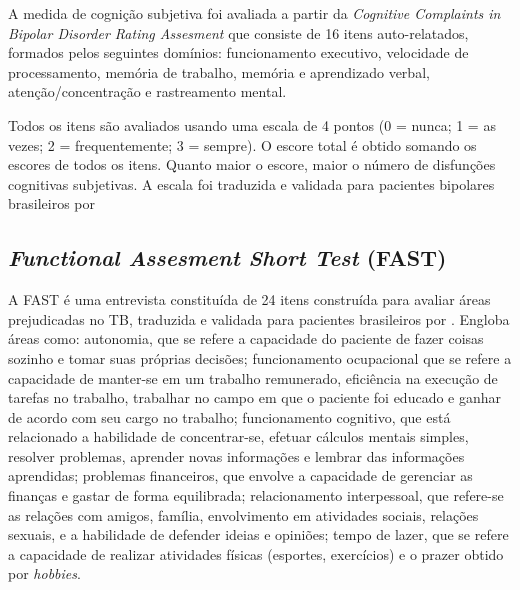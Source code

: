 \documentclass[chapter=TITLE,
               oneside,
               12pt,
               a4paper,
               english,
               brazil]{abntex2}    %
\begin{document}
            A medida de cognição subjetiva foi avaliada a partir da
            \textit{Cognitive Complaints in Bipolar Disorder Rating Assesment}
            que consiste de 16 itens auto-relatados, formados pelos seguintes domínios:
            funcionamento executivo, velocidade de processamento, memória de trabalho,
            memória e aprendizado verbal, atenção/concentração e rastreamento mental.
    
            Todos os itens são avaliados usando uma escala de 4 pontos
            (0 = nunca; 1 = as vezes; 2 = frequentemente; 3 = sempre).
            O escore total é obtido somando os escores de todos os itens.
            Quanto maior o escore, maior o número de disfunções cognitivas subjetivas.
            A escala foi traduzida e validada para pacientes bipolares brasileiros
            por \textcite{lima_validity_2018}
    
        \subsection{\textit{Functional Assesment Short Test} (FAST)}
        \label{sec:fast}
    
            A FAST é uma entrevista constituída de 24 itens construída para avaliar
            áreas prejudicadas no TB, traduzida e validada para pacientes brasileiros
            por \textcite{cacilhas_validity_2009}.
            Engloba áreas como: autonomia, que se refere a capacidade do paciente de
            fazer coisas sozinho e tomar suas próprias decisões; funcionamento
            ocupacional que se refere a capacidade de manter-se em um trabalho
            remunerado, eficiência na execução de tarefas no trabalho, trabalhar
            no campo em que o paciente foi educado e ganhar de acordo com seu cargo
            no trabalho; funcionamento cognitivo, que está relacionado a habilidade
            de concentrar-se, efetuar cálculos mentais simples, resolver problemas,
            aprender novas informações e lembrar das informações aprendidas; problemas
            financeiros, que envolve a capacidade de gerenciar as finanças e gastar de
            forma equilibrada; relacionamento interpessoal, que refere-se as relações
            com amigos, família, envolvimento em atividades sociais, relações sexuais,
            e a habilidade de defender ideias e opiniões; tempo de lazer, que se refere
            a capacidade de realizar atividades físicas (esportes, exercícios) e o prazer
            obtido por \textit{hobbies}.
    
\end{document}
